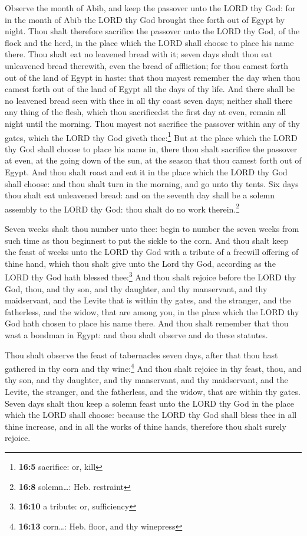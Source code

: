  Observe the month of Abib, and keep the passover unto the
LORD thy God: for in the month of Abib the LORD thy God brought thee
forth out of Egypt by night.  Thou shalt therefore
sacrifice the passover unto the LORD thy God, of the flock and the herd,
in the place which the LORD shall choose to place his name there.
 Thou shalt eat no leavened bread with it; seven days
shalt thou eat unleavened bread therewith, even the bread of affliction;
for thou camest forth out of the land of Egypt in haste: that thou
mayest remember the day when thou camest forth out of the land of Egypt
all the days of thy life.  And there shall be no leavened
bread seen with thee in all thy coast seven days; neither shall there
any thing of the flesh, which thou sacrificedst the first day at even,
remain all night until the morning.  Thou mayest not
sacrifice the passover within any of thy gates, which the LORD thy God
giveth thee:\footnote{\textbf{16:5} sacrifice: or, kill} 
But at the place which the LORD thy God shall choose to place his name
in, there thou shalt sacrifice the passover at even, at the going down
of the sun, at the season that thou camest forth out of Egypt.
 And thou shalt roast and eat it in the place which the
LORD thy God shall choose: and thou shalt turn in the morning, and go
unto thy tents.  Six days thou shalt eat unleavened bread:
and on the seventh day shall be a solemn assembly to the LORD thy God:
thou shalt do no work therein.\footnote{\textbf{16:8} solemn\ldots: Heb.
  restraint}

 Seven weeks shalt thou number unto thee: begin to number
the seven weeks from such time as thou beginnest to put the sickle to
the corn.  And thou shalt keep the feast of weeks unto
the LORD thy God with a tribute of a freewill offering of thine hand,
which thou shalt give unto the Lord thy God, according as the LORD thy
God hath blessed thee:\footnote{\textbf{16:10} a tribute: or,
  sufficiency}  And thou shalt rejoice before the LORD
thy God, thou, and thy son, and thy daughter, and thy manservant, and
thy maidservant, and the Levite that is within thy gates, and the
stranger, and the fatherless, and the widow, that are among you, in the
place which the LORD thy God hath chosen to place his name there.
 And thou shalt remember that thou wast a bondman in
Egypt: and thou shalt observe and do these statutes.

 Thou shalt observe the feast of tabernacles seven days,
after that thou hast gathered in thy corn and thy wine:\footnote{\textbf{16:13}
  corn\ldots: Heb. floor, and thy winepress}  And thou
shalt rejoice in thy feast, thou, and thy son, and thy daughter, and thy
manservant, and thy maidservant, and the Levite, the stranger, and the
fatherless, and the widow, that are within thy gates. 
Seven days shalt thou keep a solemn feast unto the LORD thy God in the
place which the LORD shall choose: because the LORD thy God shall bless
thee in all thine increase, and in all the works of thine hands,
therefore thou shalt surely rejoice.

